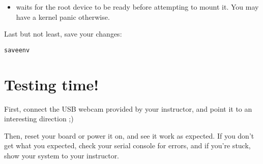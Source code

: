 \begin{itemize}
\item {} waits for the root device to be ready before
attempting to mount it. You may have a kernel panic otherwise.
\end{itemize}

Last but not least, save your changes:
\begin{verbatim}
saveenv
\end{verbatim}

\section{Testing time!}

First, connect the USB webcam provided by your instructor, and point it
to an interesting direction ;)

Then, reset your board or power it on, and see it work as expected. If
you don't get what you expected, check your serial console for errors,
and if you're stuck, show your system to your instructor.
